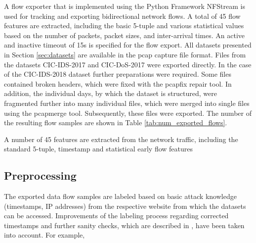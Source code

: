 \documentclass[../../main.tex]{subfiles}
\begin{document}
A flow exporter that is implemented using the Python Framework NFStream is used for tracking and exporting bidirectional network flows. A total of 45 flow features are extracted, including the basic 5-tuple and various statistical values based on the number of packets, packet sizes, and inter-arrival times. An active and inactive timeout of 15s is specified for the flow export. All datasets presented in Section \ref{sec:datasets} are available in the pcap capture file format. Files from the datasets CIC-IDS-2017 and CIC-DoS-2017 were exported directly. In the case of the CIC-IDS-2018 dataset further preparations were required. Some files contained broken headers, which were fixed with the pcapfix repair tool. In addition, the individual days, by which the dataset is structured, were fragmented further into many individual files, which were merged into single files using the pcapmerge tool. Subsequently, these files were exported. The number of the resulting flow samples are shown in Table \ref{tab:num_exported_flows}.




\begin{table}[t]
    \footnotesize
    \centering
    \setlength{\extrarowheight}{0pt}
    \addtolength{\extrarowheight}{\aboverulesep}
    \addtolength{\extrarowheight}{\belowrulesep}
    \setlength{\aboverulesep}{0pt}
    \setlength{\belowrulesep}{0pt}
    \setlength{\extrarowheight}{.1em}
     
    \caption[Extracted Flow Features]{A number of 45 features are extracted from the network traffic, including the standard 5-tuple, timestamp and statistical early flow features}
    \label{tab:flow_features}
\end{table}


\subsection{Preprocessing}\label{subsec:preprocessing}
The exported data flow samples are labeled based on basic attack knowledge (timestamps, IP addresses) from the respective website from which the datasets can be accessed. Improvements of the labeling process regarding corrected timestamps and further sanity checks, which are described in \cite{engelen2021}, have been taken into account. 
For example, %
\end{document}
